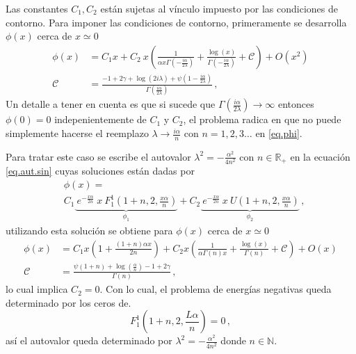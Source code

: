 Las constantes $C_1,C_2$ están sujetas al vínculo impuesto por las condiciones de contorno.
Para imponer las condiciones de contorno, primeramente se desarrolla $\phi (x)$ cerca de $x \simeq 0$ 
\begin{align}
\phi  ( x ) &=
C _1  x  + 
C _2 \ x 
\left( 
\frac{1}{  \alpha x  \Gamma ( - \frac{i \alpha}{2  \lambda}  )   }  +
\frac{\log (x) }{\Gamma ( - \frac{ i \alpha}{2 \lambda} ) } + \mathscr{C} \right) + O(x ^2)
	\nonumber
\\[10pt]
\mathscr{C} &= 
\frac{
-1 + 2 \gamma + \log ( 2  i \lambda ) + \psi (1 - \frac{i \alpha}{2 \lambda})
}
{\Gamma (\frac{i \alpha}{2 \lambda})}
\, ,
\label{eq.scat}
\end{align}
Un detalle a tener en cuenta es que si sucede que $\Gamma ( \frac{i \alpha}{2 \lambda}  ) \rightarrow \infty$ entonces $\phi (0) = 0$ indepenientemente de $C _1$ y $C _2$, el problema radica en que no puede simplemente hacerse el reemplazo $\lambda \rightarrow  \frac{i \alpha }{ n } $ con $n=1,2,3 \dots$ en \eqref{eq.phi}. 

Para tratar este caso se escribe el autovalor $\lambda ^2 = - \frac{\alpha ^2}{4 n ^2}$ con $n \in \mathbb{R _+}$ en la ecuación \eqref{eq.aut.sin} cuyas soluciones están dadas por
\begin{align}
& \nonumber 
	\phi (x)     =
\\ &        
	    C _1
    	\underbrace{
				     \ e ^{- \frac{x \alpha}{2n}} \ x \ 
				     F _{1} ^{1}
				     \left( 1+n,2, \frac{x \alpha}{n} \right) 
				     } _ {\phi_1} 				     
				     + 
      C _2 
      \underbrace{ 
      			   \ e^{- \frac{x \alpha}{2n}} \ x \ 
      			   U 
      			   \left( 1+n,2, \frac{x \alpha}{n} \right)
      			   } _{\phi_2} 
    \, ,
\label{eq.phi.2}
\end{align}
utilizando esta solución se obtiene para $\phi (x) $ cerca de $x \simeq 0$ 
\begin{align}
\nonumber
	\phi (x) 
&=
	C _1 x 
	\left(1 + \frac{(1+n) \alpha x}{2 n } \right)
	+ C _2 x
	\left(
	\frac{1}{\alpha \Gamma (n) x } + \frac{\log (x)}{\Gamma (n)} +\mathscr{C}
	\right)
	+ O(x)
\\
\mathscr{C} 
&=
\frac{\psi (1+n) + \log \left( \frac{\alpha}{n} \right) -1 + 2 \gamma}{\Gamma (n)}
\, ,
\end{align}
lo cual implica $C _2 = 0$. Con lo cual, el problema de energías negativas queda determinado por los ceros de.
\begin{equation}
	F _1 ^1 
	\left(
		1+n,2, \frac{L \alpha}{n}
		\right) = 0
\, ,		
\end{equation}
así el autovalor queda determinado por $\lambda ^2 = - \frac{\alpha ^2}{4 n ^2}$ donde \mbox{$n \in \mathbb{N}$}.


